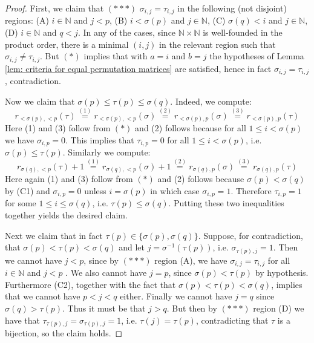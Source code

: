 \documentclass[oneside,11pt,reqno]{amsart}
\newcommand{\nn}{\ensuremath{\mathbb{N}}}
\theoremstyle{definition}
\newtheorem{proof techniques}{Proof Techniques}
\begin{document}
\begin{proof}
First, we claim that $(\ast \ast \ast)$ $\sigma_{i , j} = \tau_{i , j}$ in the following (not disjoint) regions: (A) $i \in \nn$ and $j < p$, (B) $i < \sigma
(p)$ and $j \in \nn$, (C) $\sigma(q) < i$ and $j \in \nn$, (D) $i \in \nn$ and $q < j$. In any of the cases, since $\nn \times \nn$ is well-founded in the product order, there is a minimal $(i , j)$ in the relevant region such that $\sigma_{i , j} \neq \tau_{i , j}$. But $(\ast)$ implies that with $a = i$ and $b  = j$ the hypotheses of Lemma \ref{lem: criteria for equal permutation matrices} are satisfied, hence in fact $\sigma_{i , j} = \tau_{i , j}$, contradiction. 

Now we claim that $\sigma(p) \leq \tau(p) \leq \sigma(q)$. Indeed, we compute:  
\begin{equation*}
    r_{<\sigma(p) , < p}(\tau) \overset{(1)}{=} r_{<\sigma(p) , < p}(\sigma) \overset{(2)}{=} r_{<\sigma(p) , p}(\sigma) \overset{(3)}{=} r_{<\sigma(p) , p}(\tau)
\end{equation*}
Here (1) and (3) follow from $(\ast)$ and (2) follows because for all $1 \leq i < \sigma(p)$ we have $\sigma_{i , p} = 0$.  This implies that $\tau_{i , p} = 0$ for all $1 \leq i < \sigma(p)$, i.e. $\sigma(p) \leq \tau(p)$. Similarly we compute: 
\begin{equation*}
    r_{\sigma(q) , <p}(\tau) + 1 \overset{(1)}{=} r_{\sigma(q) , <p}(\sigma) + 1 \overset{(2)}{=} r_{\sigma(q) , p}(\sigma) \overset{(3)}{=} r_{\sigma(q) , p}(\tau)
\end{equation*}
Here again (1) and (3) follow from $(\ast)$ and (2) follows because $\sigma(p) < \sigma(q)$ by (C1) and $\sigma_{i , p} = 0$ unless $i = \sigma(p)$ in which case $\sigma_{i , p} = 1$. Therefore $\tau_{i , p} = 1$ for some $1 \leq i \leq \sigma(q)$, i.e. $\tau(p) \leq \sigma(q)$. Putting these two inequalities together yields the desired claim.  

Next we claim that in fact $\tau(p) \in \{ \sigma(p), \sigma(q) \}$. Suppose, for contradiction, that $\sigma(p) < \tau(p) < \sigma(q)$ and let $j = \sigma^{-1}(\tau(p))$, i.e. $\sigma_{\tau(p) , j} = 1$. Then we cannot have $j < p$, since by $(\ast \ast \ast)$ region (A), we have $\sigma_{i , j} = \tau_{i , j}$ for all $i \in \nn$ and $j < p$ . We also cannot have $j = p$, since $\sigma(p) < \tau(p)$ by hypothesis. Furthermore (C2), together with the fact that $\sigma(p) < \tau(p) < \sigma(q)$, implies that we cannot have $p < j < q$ either. Finally we cannot have $j = q$ since $\sigma(q) > \tau(p)$. Thus it must be that $j > q$. But then by $(\ast \ast \ast)$ region (D) we have that $\tau_{\tau(p) , j} = \sigma_{\tau(p) , j} = 1$, i.e. $\tau(j) = \tau(p)$, contradicting that $\tau$ is a bijection, so the claim holds.


\end{proof}
\end{document}
